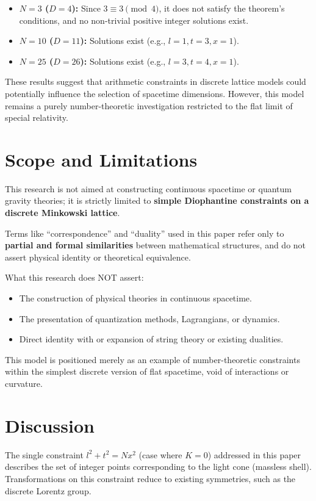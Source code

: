 \documentclass[11pt,a4paper]{article}
\begin{document}
\begin{itemize}
    \item \textbf{\( N=3 \) (\( D=4 \)):} Since \( 3 \equiv 3 \pmod{4} \), it does not satisfy the theorem's conditions, and no non-trivial positive integer solutions exist.
    \item \textbf{\( N=10 \) (\( D=11 \)):} Solutions exist (e.g., \( l=1, t=3, x=1 \)).
    \item \textbf{\( N=25 \) (\( D=26 \)):} Solutions exist (e.g., \( l=3, t=4, x=1 \)).
\end{itemize}

These results suggest that arithmetic constraints in discrete lattice models could potentially influence the selection of spacetime dimensions. However, this model remains a purely number-theoretic investigation restricted to the flat limit of special relativity.

\section{Scope and Limitations}
This research is not aimed at constructing continuous spacetime or quantum gravity theories; it is strictly limited to \textbf{simple Diophantine constraints on a discrete Minkowski lattice}.

Terms like ``correspondence'' and ``duality'' used in this paper refer only to \textbf{partial and formal similarities} between mathematical structures, and do not assert physical identity or theoretical equivalence.

What this research does NOT assert:
\begin{itemize}
    \item The construction of physical theories in continuous spacetime.
    \item The presentation of quantization methods, Lagrangians, or dynamics.
    \item Direct identity with or expansion of string theory or existing dualities.
\end{itemize}

This model is positioned merely as an example of number-theoretic constraints within the simplest discrete version of flat spacetime, void of interactions or curvature.

\section{Discussion}
The single constraint \( l^2 + t^2 = N x^2 \) (case where \( K=0 \)) addressed in this paper describes the set of integer points corresponding to the light cone (massless shell). Transformations on this constraint reduce to existing symmetries, such as the discrete Lorentz group.
\end{document}
